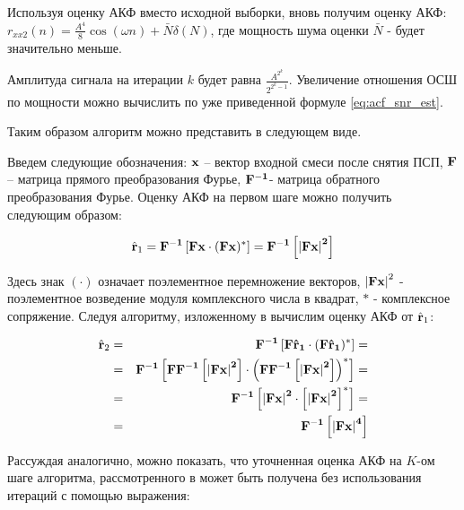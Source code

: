 Используя оценку АКФ вместо исходной выборки, вновь получим оценку АКФ:
${r_{xx2}(n) = \frac{A^4}{8} \cos{(\omega n)} + \bar{N} \delta{(N)}}$,
где мощность шума оценки ${\bar{N}}$ - будет значительно меньше.

Амплитуда сигнала на итерации ${k}$ будет равна ${\frac{A^{2^k}}{2^{2^k-1}}}$. Увеличение отношения ОСШ по мощности можно
вычислить по уже приведенной формуле \ref{eq:acf_snr_est}. 

Таким образом алгоритм можно представить в следующем виде.

Введем следующие обозначения: ${\bf{x}}$ – вектор входной смеси после снятия ПСП, ${\bf{F}}$ – матрица прямого преобразования Фурье,
${\bf{F}^{-1}}$- матрица обратного преобразования Фурье.  Оценку АКФ на первом шаге можно получить следующим образом:

\begin{center}
\begin{equation}
	\label{eq:akf_1}
	\hat{\bf{r}}_1 = \bf{F}^{-1}\left[ \bf{Fx} \cdot (\bf{Fx})^* \right] = \bf{F}^{-1} \left[ \left| \bf{Fx} \right| ^2 \right]
\end{equation}
\end{center}

Здесь знак ${(\cdot)}$  означает поэлементное перемножение векторов, ${\left| \bf{Fx} \right| ^2}$ - поэлементное возведение модуля комплексного числа в квадрат, ${*}$ -
комплексное сопряжение.  Следуя алгоритму, изложенному в \cite{ostanin_akf} вычислим оценку АКФ от ${\hat{\bf{r}}_1}$:
\begin{center}
\begin{eqnarray}
	\label{eq:akf_2}
	\hat{\bf{r}}_2 & = & \bf{F}^{-1}\left[ \bf{F} \hat{\bf{r}}_1 \cdot (\bf{F} \hat{\bf{r}}_1)^* \right] = \nonumber \\
		& = & \bf{F}^{-1}	\left[ 
				\bf{FF}^{-1} \left[
						\left| \bf{Fx} \right| ^2
					\right]
						\cdot \left( \bf{FF}^{-1} \left[ \left| \bf{Fx} \right| ^2 \right]
					\right) ^*
			\right] = \nonumber \\
		& = & \bf{F}^{-1} \left[ \left| \bf{Fx} \right| ^2 \cdot \left[ \left| \bf{Fx} \right| ^2 \right] ^* \right] =  \nonumber \\
		& = & \bf{F}^{-1} \left[ \left| \bf{Fx} \right| ^4 \right]
\end{eqnarray}
\end{center}

Рассуждая аналогично, можно показать, что уточненная оценка АКФ на ${K}$-ом шаге алгоритма, рассмотренного в \cite{ostanin_akf}
может быть получена без использования итераций с помощью выражения:

